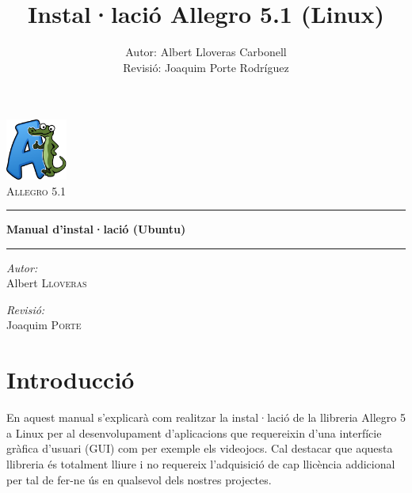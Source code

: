 \documentclass[11pt]{article}
\title{Instal·lació Allegro 5.1 (Linux)}
\author{Autor: Albert Lloveras Carbonell\\Revisió: Joaquim Porte Rodríguez}
\date{}
\begin{document}
\pagestyle{empty}
\begin{center}

	\includegraphics[width=0.15\textwidth]{img/allegro.png}~\\[1cm]
	
	\textsc{\LARGE Allegro 5.1}\\[1.5cm]
	
	\hrule
	\vspace{8pt}
	\huge{\bfseries Manual d'instal·lació (Ubuntu)}
	\vspace{8pt}
	\hrule	
	\vspace{12pt	}

	\noindent
	\begin{minipage}{0.4\textwidth}
		\begin{flushleft} \large
			\emph{Autor:}\\
			Albert \textsc{Lloveras}
		\end{flushleft}
	\end{minipage}%
	\begin{minipage}{0.4\textwidth}
		\begin{flushright} \large
			\emph{Revisió:} \\
			Joaquim \textsc{Porte}
		\end{flushright}
	\end{minipage}
	\vfill

\end{center}

\newpage

\pagestyle{empty}
\tableofcontents


\newpage
\pagestyle{pageStyle}

\section{Introducció}
En aquest manual s'explicarà com realitzar la instal·lació de la llibreria Allegro 5 a Linux per al desenvolupament d'aplicacions que requereixin d'una interfície gràfica d'usuari (GUI) com per exemple els videojocs. Cal destacar que aquesta llibreria és totalment lliure i no requereix l'adquisició de cap llicència addicional per tal de fer-ne ús en qualsevol dels nostres projectes.
\end{document}
